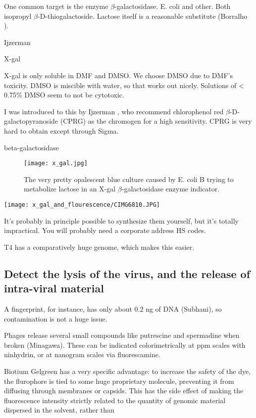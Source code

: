 \documentclass[paper.tex]{subfiles}
\begin{document}
One common target is the enzyme $\beta$-galactosidase. E. coli and other. Both  isopropyl $\beta$-D-thiogalactoside. Lactose itself is a reasonable substitute (Borralho \cite{Lactose2002}).

Ijzerman

X-gal \cite{Improved}


X-gal is only soluble in DMF and DMSO. We choose DMSO due to DMF's toxicity. DMSO is miscible with water, so that works out nicely. Solutions of < 0.75\% DMSO seem to not be cytotoxic.


I was introduced to this by Ijzerman \cite{liquid1993}, who recommend chlorophenol red $\beta$-D-galactopyranoside (CPRG) as the chromogen for a high sensitivity. CPRG is very hard to obtain except through Sigma.



beta-galactosidase



\begin{figure}[H]
	\captionsetup{singlelinecheck = false, justification=justified}
	\centering
	\texttt{[image: x\_gal.jpg]}
	\caption{The very pretty opalescent blue culture caused by E. coli B trying to metabolize lactose in an X-gal $\beta$-galactosidase enzyme indicator.}
\end{figure}




\texttt{[image: x\_gal\_and\_flourescence/CIMG6810.JPG]}

 It’s probably in principle possible to synthesize them yourself, but it’s totally impractical. You will probably need a corporate address HS codes. 

T4 has a comparatively huge genome, which makes this easier.


\subsection{Detect the lysis of the virus, and the release of intra-viral material}

A fingerprint, for instance, has only about 0.2 ng of DNA (Subhani), so contamination is not a huge issue.

Phages release several small compounds like putrescine and spermadine when broken (Minagawa\cite{characteristics1961}). These can be indicated colorimetrically at ppm scales with ninhydrin, or at nanogram scales via fluorescamine. 


Biotium Gelgreen has a very specific advantage: to increase the safety of the dye, the flurophore is tied to some huge proprietary molecule, preventing it from diffusing through membranes or capsids. This has the side effect of making the fluorescence intensity strictly related to the quantity of genomic material dispersed in the solvent, rather than 
\end{document}
